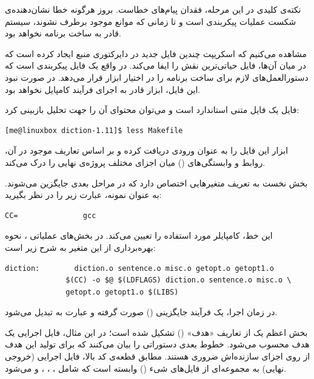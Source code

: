 نکته‌ی کلیدی در این مرحله، فقدان پیام‌های خطاست. بروز هرگونه خطا نشان‌دهنده‌ی شکست عملیات پیکربندی است و تا زمانی که موانع موجود برطرف نشوند، سیستم قادر به ساخت برنامه نخواهد بود.

مشاهده می‌کنیم که اسکریپت  چندین فایل جدید در دایرکتوری منبع ایجاد کرده است که در میان آن‌ها، فایل  حیاتی‌ترین نقش را ایفا می‌کند.  در واقع یک فایل پیکربندی است که دستورالعمل‌های لازم برای ساخت برنامه را در اختیار ابزار  قرار می‌دهد. در صورت نبود این فایل، ابزار  قادر به اجرای فرآیند کامپایل نخواهد بود.

فایل  یک فایل متنی استاندارد است و می‌توان محتوای آن را جهت تحلیل بازبینی کرد:

\begin{latin}
\begin{lstlisting}
[me@linuxbox diction-1.11]$ less Makefile
\end{lstlisting}
\end{latin}

ابزار  این فایل را به عنوان ورودی دریافت کرده و بر اساس تعاریف موجود در آن، روابط و وابستگی‌های () میان اجزای مختلف پروژه‌ی نهایی را درک می‌کند.

بخش نخست  به تعریف متغیرهایی اختصاص دارد که در مراحل بعدی جایگزین می‌شوند. به عنوان نمونه، عبارت زیر را در نظر بگیرید:

\begin{latin}
\begin{lstlisting}
CC=               gcc
\end{lstlisting}
\end{latin}

این خط، کامپایلر مورد استفاده را  تعیین می‌کند. در بخش‌های عملیاتی ، نحوه بهره‌برداری از این متغیر به شرح زیر است:

\begin{latin}
\begin{lstlisting}
diction:        diction.o sentence.o misc.o getopt.o getopt1.o
	          $(CC) -o $@ $(LDFLAGS) diction.o sentence.o misc.o \
	          getopt.o getopt1.o $(LIBS)
\end{lstlisting}
\end{latin}

در زمان اجرا، یک فرآیند جایگزینی () صورت گرفته و عبارت  به  تبدیل می‌شود.

بخش اعظم یک  از تعاریف «هدف» () تشکیل شده است؛ در این مثال، فایل اجرایی  یک هدف محسوب می‌شود. خطوط بعدی دستوراتی را بیان می‌کنند که برای تولید این هدف از روی اجزای سازنده‌اش ضروری هستند. مطابق قطعه‌ی کد بالا، فایل اجرایی  (خروجی نهایی) به مجموعه‌ای از فایل‌های شیء () وابسته است که شامل ، ، ،  و  می‌شود.

